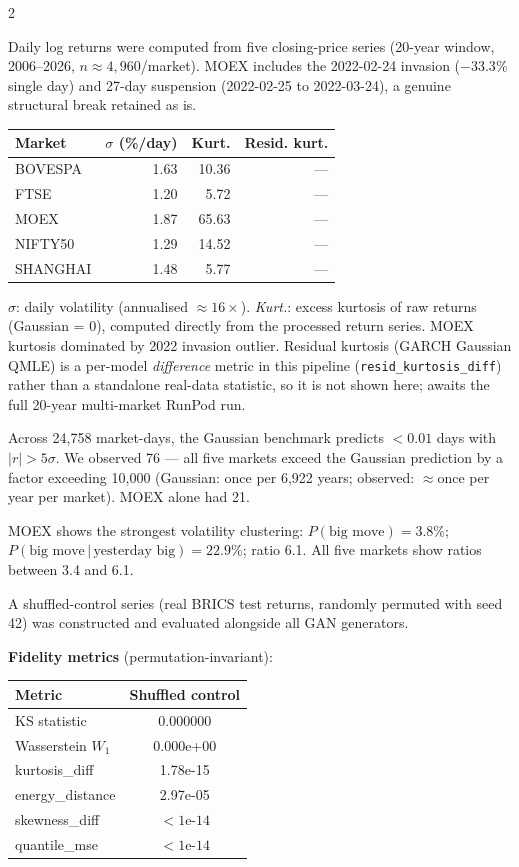 \documentclass[10pt]{article}
\newcommand{\navybox}[2]{\begin{tcolorbox}[mybox={Navy}{LBg},title={#1}]#2\end{tcolorbox}}
\newcommand{\skybox}[2]{\begin{tcolorbox}[mybox={Sky}{BBg},title={#1}]#2\end{tcolorbox}}
\begin{document}
\begin{multicols}{2}

\navybox{BRICS Data Characteristics (Table~1)}{%
Daily log returns were computed from five closing-price series (20-year window, 2006--2026, $n\approx4{,}960$/market). MOEX includes the 2022-02-24 invasion ($-33.3\%$ single day) and 27-day suspension (2022-02-25 to 2022-03-24), a genuine structural break retained as is.

\smallskip
\begin{tabular}{@{}lrrr@{}}
\toprule
Market & $\sigma$ (\%/day) & Kurt. & Resid. kurt. \\
\midrule
BOVESPA & 1.63 & 10.36 & --- \\
FTSE & 1.20 & 5.72 & --- \\
MOEX & 1.87 & 65.63 & --- \\
NIFTY50 & 1.29 & 14.52 & --- \\
SHANGHAI & 1.48 & 5.77 & --- \\
\bottomrule
\end{tabular}

\smallskip
\textit{$\sigma$}: daily volatility (annualised $\approx16\times$). \textit{Kurt.}: excess kurtosis of raw returns (Gaussian = 0), computed directly from the processed return series. MOEX kurtosis dominated by 2022 invasion outlier. Residual kurtosis (GARCH Gaussian QMLE) is a per-model \emph{difference} metric in this pipeline (\texttt{resid\_kurtosis\_diff}) rather than a standalone real-data statistic, so it is not shown here; awaits the full 20-year multi-market RunPod run.

Across 24,758 market-days, the Gaussian benchmark predicts $<0.01$ days with $|r|>5\sigma$. We observed 76 --- all five markets exceed the Gaussian prediction by a factor exceeding 10{,}000 (Gaussian: once per 6,922 years; observed: $\approx$once per year per market). MOEX alone had 21.

MOEX shows the strongest volatility clustering: $P(\text{big move}) = 3.8\%$; $P(\text{big move}\,|\,\text{yesterday big}) = 22.9\%$; ratio 6.1. All five markets show ratios between 3.4 and 6.1.}

\skybox{Shuffled-Control Audit (Table~2)}{%
A shuffled-control series (real BRICS test returns, randomly permuted with seed 42) was constructed and evaluated alongside all GAN generators.

\smallskip
\textbf{Fidelity metrics} (permutation-invariant):
\begin{tabular}{@{}lc@{}}
\toprule
Metric & Shuffled control \\
\midrule
KS statistic         & 0.000000 \\
Wasserstein $W_1$    & 0.000e+00 \\
kurtosis\_diff       & 1.78e-15 \\
energy\_distance     & 2.97e-05 \\
skewness\_diff       & $<1\text{e-14}$ \\
quantile\_mse        & $<1\text{e-14}$ \\
\bottomrule
\end{tabular}

}
\end{multicols}
\end{document}
